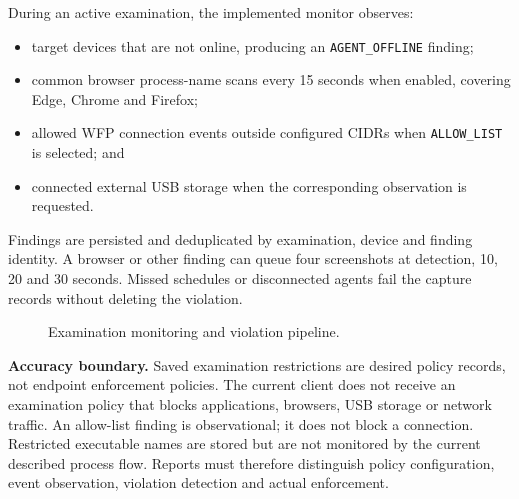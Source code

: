 \documentclass[12pt,a4paper]{report}
\begin{document}
During an active examination, the implemented monitor observes:
\begin{itemize}
\item target devices that are not online, producing an \texttt{AGENT\_OFFLINE}
finding;
\item common browser process-name scans every 15 seconds when enabled,
covering Edge, Chrome and Firefox;
\item allowed WFP connection events outside configured CIDRs when
\texttt{ALLOW\_LIST} is selected; and
\item connected external USB storage when the corresponding observation is
requested.
\end{itemize}
Findings are persisted and deduplicated by examination, device and finding
identity. A browser or other finding can queue four screenshots at detection,
10, 20 and 30 seconds. Missed schedules or disconnected agents fail the
capture records without deleting the violation.

\begin{figure}[H]
\centering
{}
\caption{Examination monitoring and violation pipeline.}
\label{fig:exam-monitoring-flow}
\end{figure}

\textbf{Accuracy boundary.} Saved examination restrictions are desired policy
records, not endpoint enforcement policies. The current client does not receive
an examination policy that blocks applications, browsers, USB storage or
network traffic. An allow-list finding is observational; it does not block a
connection. Restricted executable names are stored but are not monitored by
the current described process flow. Reports must therefore distinguish policy
configuration, event observation, violation detection and actual enforcement.
\end{document}
